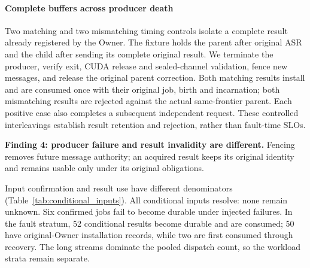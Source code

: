 \paragraph{Complete buffers across producer death}
Two matching and two mismatching timing controls isolate a complete
result already registered by the Owner. The fixture holds the parent
after original ASR and the child after sending its complete original
result. We terminate the producer, verify exit, CUDA release and
sealed-channel validation, fence new messages, and release the original
parent correction. Both matching results install and are consumed once
with their original job, birth and incarnation; both mismatching results
are rejected against the actual same-frontier parent. Each positive case
also completes a subsequent independent request. These controlled
interleavings establish result retention and rejection, rather than
fault-time SLOs.
\par\noindent\textbf{Finding 4: producer failure and result invalidity are different.}
Fencing removes future message authority; an acquired result keeps its
original identity and remains usable only under its original obligations.

Input confirmation and result use have different denominators
(Table~\ref{tab:conditional_inputs}). All conditional inputs resolve:
none remain unknown. Six confirmed jobs fail to become durable under
injected failures. In the fault stratum, 52 conditional results become
durable and are consumed; 50 have original-Owner installation records,
while two are first consumed through recovery. The long streams dominate
the pooled dispatch count, so the workload strata remain separate.

